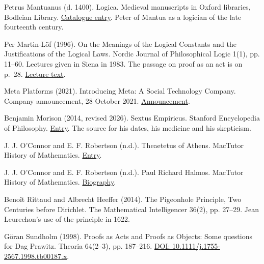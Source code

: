 \documentclass[11pt,twoside]{article}
\theoremstyle{thielethm}
\theoremstyle{thieledef}
\theoremstyle{thieledef}
\theoremstyle{thieledef}
\theoremstyle{thielethm}
\theoremstyle{thieleobs}
\theoremstyle{thielethm}
\begin{document}
\noindent Petrus Mantuanus (d. 1400). Logica. Medieval manuscripts in Oxford libraries, Bodleian Library. \href{https://medieval.bodleian.ox.ac.uk/catalog/work_3607}{Catalogue entry}. Peter of Mantua as a logician of the late fourteenth century.
\par\medskip

\noindent Per Martin-Löf (1996). On the Meanings of the Logical Constants and the Justifications of the Logical Laws. Nordic Journal of Philosophical Logic 1(1), pp. 11--60. Lectures given in Siena in 1983. The passage on proof as an act is on p.~28. \href{https://archive-pml.github.io/martin-lof/pdfs/Meanings-of-the-Logical-Constants-1983.pdf}{Lecture text}.
\par\medskip

\noindent Meta Platforms (2021). Introducing Meta: A Social Technology Company. Company announcement, 28 October 2021. \href{https://about.fb.com/news/2021/10/facebook-company-is-now-meta/}{Announcement}.
\par\medskip

\noindent Benjamin Morison (2014, revised 2026). Sextus Empiricus. Stanford Encyclopedia of Philosophy. \href{https://plato.stanford.edu/entries/sextus-empiricus/}{Entry}. The source for his dates, his medicine and his skepticism.
\par\medskip

\noindent J. J. O'Connor and E. F. Robertson (n.d.). Theaetetus of Athens. MacTutor History of Mathematics. \href{https://mathshistory.st-andrews.ac.uk/Biographies/Theaetetus/}{Entry}.
\par\medskip

\noindent J. J. O'Connor and E. F. Robertson (n.d.). Paul Richard Halmos. MacTutor History of Mathematics. \href{https://mathshistory.st-andrews.ac.uk/Biographies/Halmos/}{Biography}.
\par\medskip

\noindent Benoît Rittaud and Albrecht Heeffer (2014). The Pigeonhole Principle, Two Centuries before Dirichlet. The Mathematical Intelligencer 36(2), pp. 27--29. Jean Leurechon's use of the principle in 1622.
\par\medskip

\noindent G\"oran Sundholm (1998). Proofs as Acts and Proofs as Objects: Some questions for Dag Prawitz. Theoria 64(2--3), pp. 187--216. \href{https://doi.org/10.1111/j.1755-2567.1998.tb00187.x}{DOI: 10.1111/j.1755-2567.1998.tb00187.x}.
\par\medskip
\end{document}
